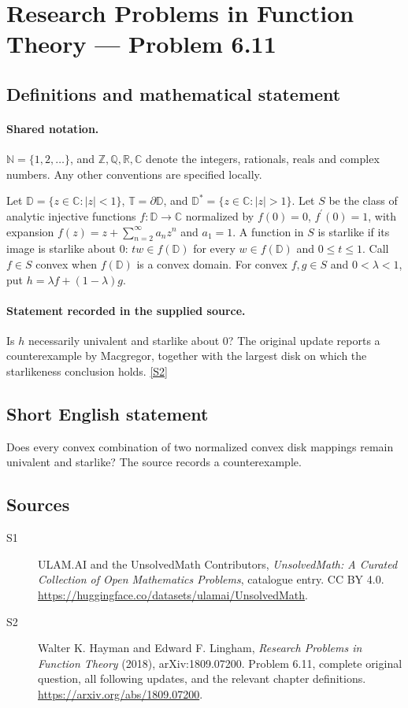 \documentclass[11pt]{book}
\newcommand{\sref}[2]{\hyperlink{source:#1:#2}{[S#2]}}
\begin{document}
\section{Research Problems in Function Theory — Problem 6.11}\label{statement}

\subsection{Definitions and mathematical statement}

\paragraph{Shared notation.}$\mathbb N=\{1,2,\ldots\}$, and $\mathbb Z,\mathbb Q,\mathbb R,\mathbb C$ denote the integers, rationals, reals and complex numbers. Any other conventions are specified locally.


Let $\mathbb D=\{z\in\mathbb C:|z|<1\}$, $\mathbb T=\partial\mathbb D$, and $\mathbb D^*=\{z\in\mathbb C:|z|>1\}$. Let $S$ be the class of analytic injective functions $f:\mathbb D\to\mathbb C$ normalized by $f(0)=0$, $f^{\prime}(0)=1$, with expansion $f(z)=z+\sum_{n=2}^{\infty}a_nz^n$ and $a_1=1$. A function in $S$ is starlike if its image is starlike about $0$: $tw\in f(\mathbb D)$ for every $w\in f(\mathbb D)$ and $0\le t\le1$. Call $f\in S$ convex when $f(\mathbb D)$ is a convex domain. For convex $f,g\in S$ and $0<\lambda<1$, put $h=\lambda f+(1-\lambda)g$.
\paragraph{Statement recorded in the supplied source.}
Is $h$ necessarily univalent and starlike about $0$? The original update reports a counterexample by Macgregor, together with the largest disk on which the starlikeness conclusion holds. \sref{statement}{2}
\subsection{Short English statement}
Does every convex combination of two normalized convex disk mappings remain univalent and starlike? The source records a counterexample.
\subsection{Sources}
\begin{description}
\item[\hypertarget{source:statement:1}{S1}] ULAM.AI and the UnsolvedMath Contributors, \emph{UnsolvedMath: A Curated Collection of Open Mathematics Problems}, catalogue entry. CC BY 4.0. \url{https://huggingface.co/datasets/ulamai/UnsolvedMath}.
\item[\hypertarget{source:statement:2}{S2}] Walter K. Hayman and Edward F. Lingham, \emph{Research Problems in Function Theory} (2018), arXiv:1809.07200. Problem 6.11, complete original question, all following updates, and the relevant chapter definitions. \url{https://arxiv.org/abs/1809.07200}.
\end{description}
\label{end:statement}
\end{document}
